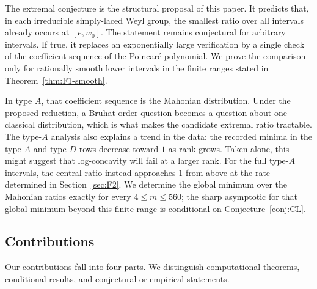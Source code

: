 \documentclass[11pt]{amsart}
\theoremstyle{plain}
\theoremstyle{definition}
\theoremstyle{remark}
\begin{document}
The extremal conjecture is the structural proposal of this paper. It
predicts that, in each irreducible simply-laced Weyl group, the smallest
ratio over all intervals already occurs at $[e,w_0]$. The statement remains
conjectural for arbitrary intervals. If true, it replaces an exponentially
large verification by a single check of the coefficient sequence of the
Poincar\'e polynomial. We prove the comparison only for rationally smooth
lower intervals in the finite ranges stated in
Theorem~\ref{thm:F1-smooth}.

In type $A$, that coefficient sequence is the Mahonian distribution. Under
the proposed reduction, a Bruhat-order question becomes a question about
one classical distribution, which is what makes the candidate extremal ratio tractable. The type-$A$ analysis also explains a trend in
the data: the recorded minima in the type-$A$ and type-$D$ rows decrease
toward $1$ as rank grows. Taken alone, this might suggest that log-concavity
will fail at a larger rank. For the full type-$A$ intervals, the central ratio instead approaches $1$ from above at the rate determined in
Section~\ref{sec:F2}. We determine the global minimum over the Mahonian
ratios exactly for every $4\le m\le560$; the sharp asymptotic for that
global minimum beyond this finite range is conditional on
Conjecture~\ref{conj:CL}.

\subsection*{Contributions} Our contributions fall into four parts. We
distinguish computational theorems, conditional results, and conjectural or
empirical statements.
\end{document}
